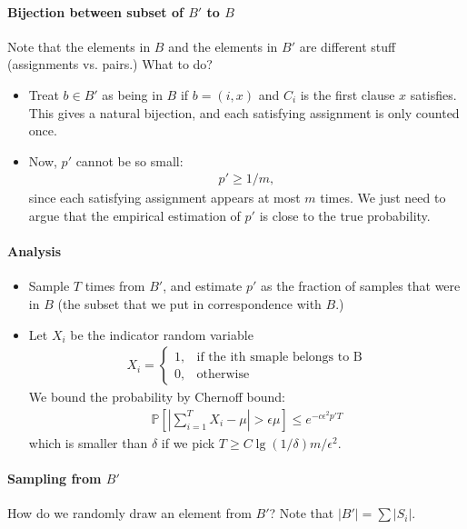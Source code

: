 \documentclass[11pt]{article}
\providecommand{\pwfun}[1]{\left\lbrace \begin{array}{ll} #1 \end{array} \right.}
\theoremstyle{definition}
\theoremstyle{remark}
\begin{document}
\paragraph{Bijection between subset of $B'$ to $B$} Note that the elements in $B$ and the elements in $B'$ are different stuff (assignments vs. pairs.) What to do?

\begin{itemize}
	\item Treat $b \in B'$ as being in $B$ if $b = (i,x)$ and $C_i$ is the first clause $x$ satisfies. This gives a natural bijection, and each satisfying assignment is only counted once.
	\item Now, $p'$ cannot be so small:
	\begin{align*}
		p' \geq 1/m,
	\end{align*}
	since each satisfying assignment appears at most $m$ times. We just need to argue that the empirical estimation of $p'$ is close to the true probability.
\end{itemize}	
	
\paragraph{Analysis}
\begin{itemize}	
	\item Sample $T$ times from $B'$, and estimate $p'$ as the fraction of samples that were in $B$ (the subset that we put in correspondence with $B$.)
	\item Let $X_i$ be the indicator random variable
	\begin{align*}
		X_i = \pwfun{1, &  \text{if the ith smaple belongs to B} \\
			0, & \text{otherwise}}
	\end{align*}
	We bound the probability by Chernoff bound:
	\begin{align*}
		\mathbb{P}\left[ \left| \sum_{i = 1}^T X_i - \mu \right| > \epsilon \mu  \right] \leq e^{-c \epsilon^2 p'T}
	\end{align*}
	which is smaller than $\delta$ if we  pick $T \geq C \lg (1/\delta) m / \epsilon^2$. 
\end{itemize}


\paragraph{Sampling from $B'$}

How do we randomly draw an element from $B'$? Note that $|B'|  = \sum |S_i|$.
\end{document}
